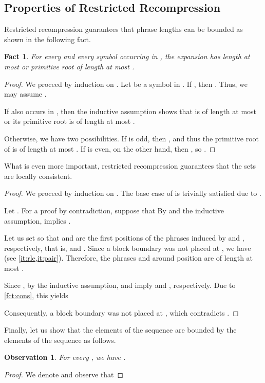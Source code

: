 \documentclass[a4paper]{article}
\newtheorem{fact}[theorem]{Fact}
\newtheorem{observation}[theorem]{Observation}
\theoremstyle{definition}
\theoremstyle{remark}
\begin{document}
\subsection{Properties of Restricted Recompression}
Restricted recompression guarantees that phrase lengths can be bounded as shown in the following fact.
\begin{fact}\label{fct:recompr}
For every  and every symbol  occurring in , the expansion  has length at most  or primitive root of length at most .
\end{fact}
\begin{proof}
  We proceed by induction on . 
  Let  be a symbol in . If , then .
  Thus, we may assume .

  If  also occurs in ,
  then the inductive assumption shows that  
  is of length at most 
  or its primitive root is of length at most . 
  
Otherwise, we have two possibilities.
  If  is odd, then ,
  and thus the primitive root of  is of length at most .
  If  is even, on the other hand, then ,
  so .
\end{proof}

What is even more important, restricted recompression guarantees that the sets  are locally consistent.
\lemcons*
\begin{proof}
  We proceed by induction on . The base case of  is trivially satisfied
  due to .
  
  Let .
  For a proof by contradiction, suppose that 
  By  and the inductive assumption,  implies .
  
  Let us set  so that
   and  are the first positions of the phrases induced by  and , respectively,
  that is,  and .
  Since a block boundary was not placed at ,
  we have  (see \cref{it:rle,it:pair}). 
  Therefore, the phrases  and  around position  are of length at most . 
  
  Since , by the inductive assumption,  and  imply  and , respectively.
  Due to \cref{fct:cons}, this yields 
  
  Consequently, a block boundary was not placed at ,
  which contradicts .
\end{proof}


Finally, let us show that the elements of the sequence  are bounded by the elements of the sequence  as follows.
\begin{observation}\label{obs:d_alpha}
For every , we have .
\end{observation}
\begin{proof}
We denote  and observe that
 
\end{proof}
\end{document}
